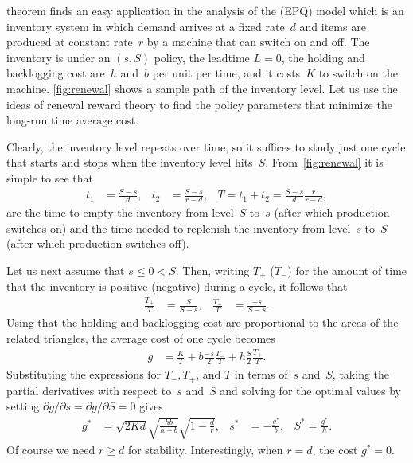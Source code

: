 \documentclass[stochastic-or.tex]{subfiles}
\begin{document}
 theorem finds an easy application in the analysis of the  (EPQ) model which is an inventory system in which demand arrives at a fixed rate~$d$ and items are produced at constant rate~$r$ by a machine that can switch on and off.
The inventory is under an $(s,S)$ policy, the leadtime $L=0$, the holding and backlogging cost are~$h$ and~$b$ per unit per time, and it costs~$K$ to switch on the machine.
\cref{fig:renewal} shows a sample path of the inventory level.
Let us use the ideas of renewal reward theory to find the policy parameters that minimize the long-run time average cost.


Clearly, the inventory level repeats over time, so it suffices to study just one cycle that starts and stops when the inventory level hits~$S$.
From~\cref{fig:renewal} it is simple to see that
  \begin{align*}
    t_1 &= \frac{S-s}{d}, & t_2 &= \frac{S-s}{r-d}, & T = t_1+t_{2} = \frac{S-s}{d}\frac{r}{r-d},
  \end{align*}
are the time to empty the inventory from level~$S$ to~$s$ (after which production switches on) and the time needed to replenish the inventory from level~$s$ to~$S$ (after which production switches off).

Let us next assume that $s\leq 0 < S$. Then, writing $T_+$ ($T_-$) for the amount of time that the inventory is positive (negative) during a cycle, it follows that
\begin{align*}
\frac{T_+}T &= \frac{S}{S-s},
& \frac{T_-}T &= \frac{-s}{S-s}.
\end{align*}
Using that the holding and backlogging cost are proportional to the areas of the related triangles,  the average cost of one cycle becomes
\begin{align*}
g &=\frac{K}{T} +  b\frac{-s}{2} \frac{T_-} T  + h\frac{S}{2} \frac{T_+}{T}.
\end{align*}
Substituting the expressions for $T_{-}, T_{+}$, and $T$ in terms of~$s$ and~$S$, taking the partial derivatives with respect to~$s$ and~$S$ and solving for the optimal values by setting $\partial g/\partial s = \partial g/\partial S = 0$ gives
\begin{align}\label{eq:renewal1}
g^{*} &= \sqrt{2Kd} \sqrt{\frac{hb}{h+b}}\sqrt{1-\frac d r}, & s^{*} &= -\frac{g^{*}}b, & S^{*} = \frac{g^{*}}{h}.
\end{align}
Of course we need  $r\geq d$ for stability. Interestingly, when $r=d$, the cost $g^{*} = 0$.
\end{document}
